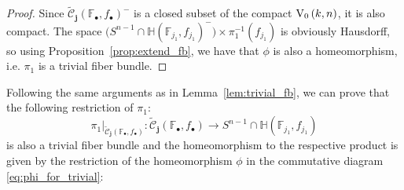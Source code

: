 \begin{proof}
Since $\tilde{\mathcal{C}}_{\mathbf{j}}{\left(\mathbb{F}_{\bullet},f_{\bullet}\right)}^-$ is a closed subset of the compact $\StO{k}{n}$, it is also compact. The space $\big(S^{n-1}\cap\mathbb{H}{\left(\mathbb{F}_{j_1},f_{j_1}\right)}^-\big)\times\pi_1^{-1}(f_{j_1})$ is obviously Hausdorff, so using Proposition~\ref{prop:extend_fb}, we have that $\phi$ is also a homeomorphism, i.e. $\pi_1$ is a trivial fiber bundle.
\end{proof}
\begin{remark}\label{rem:trivial_fb_interior} Following the same arguments as in Lemma~\ref{lem:trivial_fb}, we can prove that the following restriction of $\pi_1$: \[\pi_1|_{\tilde{\mathcal{C}}_{\mathbf{j}}(\mathbb{F}_{\bullet},f_{\bullet})}:\tilde{\mathcal{C}}_{\mathbf{j}}(\mathbb{F}_{\bullet},f_{\bullet})\to S^{n-1}\cap\mathbb{H}(\mathbb{F}_{j_1},f_{j_1})\]
is also a trivial fiber bundle and the homeomorphism to the respective product is given by the restriction of the homeomorphism $\phi$ in the commutative diagram \eqref{eq:phi_for_trivial}:
\begin{center}
\end{center}
\end{remark}


